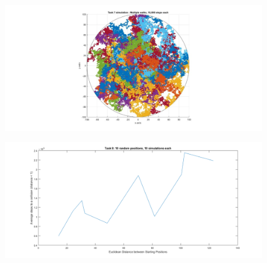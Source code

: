 \documentclass[10pt, a4paper]{article}
\begin{document}
\begin{figure}[H]
    \includegraphics[width=\textwidth]{Diagrams/Task 7 Testing/multiple_walks_task_7.jpeg}
    \caption{}
    \label{fig:9}
\end{figure}

\begin{figure}[H]
    \includegraphics[width=\textwidth]{Diagrams/Task 8 Testing/graph.png}
    \caption{}
    \label{fig:10}
\end{figure}
\end{document}
